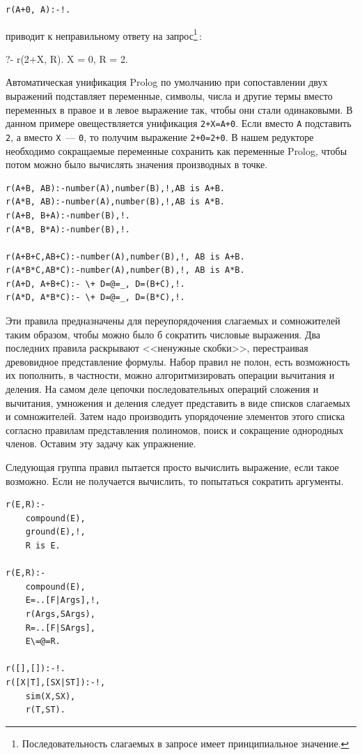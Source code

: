 \documentclass[a4paper,14pt, openany, twoside, draft]{extbook} %
\begin{document}
\begin{verbatim}
r(A+0, A):-!.
\end{verbatim}

\noindent{}приводит к неправильному ответу на запрос\footnote{Последовательность слагаемых в запросе имеет принципиальное значение.}\,:

\begin{proexp}
?- r(2+X, R).
X = 0,
R = 2.
\end{proexp}

Автоматическая унификация Prolog по умолчанию при сопоставлении двух выражений подставляет переменные, символы, числа и другие термы вместо переменных в правое и в левое выражение так, чтобы они стали одинаковыми.  В данном примере овеществляется унификация \texttt{2+X=A+0}.  Если вместо \texttt{A} подставить \texttt{2}, а вместо \texttt{X}~--- \texttt{0}, то получим выражение \texttt{2+0=2+0}.  В нашем редукторе необходимо сокращаемые переменные сохранить как переменные \foreignlanguage{english}{Prolog}, чтобы потом можно было вычислять значения производных в точке.

\begin{verbatim}
r(A+B, AB):-number(A),number(B),!,AB is A+B.
r(A*B, AB):-number(A),number(B),!,AB is A*B.
r(A+B, B+A):-number(B),!.
r(A*B, B*A):-number(B),!.

r(A+B+C,AB+C):-number(A),number(B),!, AB is A+B.
r(A*B*C,AB*C):-number(A),number(B),!, AB is A*B.
r(A+D, A+B+C):- \+ D=@=_, D=(B+C),!.
r(A*D, A*B*C):- \+ D=@=_, D=(B*C),!.
\end{verbatim}

Эти правила предназначены для переупорядочения слагаемых и сомножителей таким образом, чтобы можно было б сократить числовые выражения.  Два последних правила раскрывают <<ненужные скобки>>, перестраивая древовидное представление формулы.  Набор правил не полон, есть возможность их пополнить, в частности, можно алгоритмизировать операции вычитания и деления.  На самом деле цепочки последовательных операций сложения и вычитания, умножения и деления следует представить в виде списков слагаемых и сомножителей.  Затем надо производить упорядочение элементов этого списка согласно правилам представления полиномов, поиск и сокращение однородных членов.  Оставим эту задачу как упражнение.

Следующая группа правил пытается просто вычислить выражение, если такое возможно.  Если не получается вычислить, то попытаться сократить аргументы.

\begin{verbatim}
r(E,R):-
    compound(E),
    ground(E),!,
    R is E.

r(E,R):-
    compound(E),
    E=..[F|Args],!,
    r(Args,SArgs),
    R=..[F|SArgs],
    E\=@=R.

r([],[]):-!.
r([X|T],[SX|ST]):-!,
    sim(X,SX),
    r(T,ST).
\end{verbatim}
\end{document}
